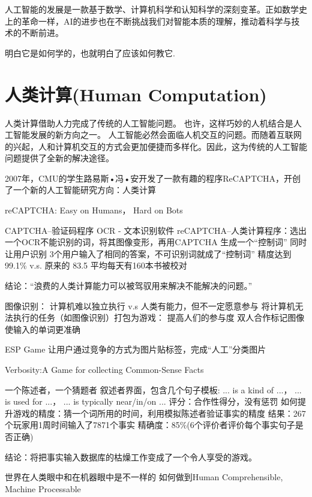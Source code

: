 人工智能的发展是一款基于数学、计算机科学和认知科学的深刻变革。正如数学史上的革命一样，AI的进步也在不断挑战我们对智能本质的理解，推动着科学与技术的不断前进。

明白它是如何学的，也就明白了应该如何教它.

\section{人类计算(Human Computation)}
人类计算借助人力完成了传统的人工智能问题。
 也许，这样巧妙的人机结合是人工智能发展的新方向之一。
人工智能必然会面临人机交互的问题。而随着互联网的兴起，人和计算机交互的方式会更加便捷而多样化。因此，这为传统的人工智能问题提供了全新的解决途径。

 2007年，CMU的学生路易斯•冯•安开发了一款有趣的程序ReCAPTCHA，开创了一个新的人工智能研究方向：人类计算

reCAPTCHA: Easy on Humans， Hard on Bots

 CAPTCHA–验证码程序
 OCR - 文本识别软件 
 reCAPTCHA–人类计算程序：选出一个OCR不能识别的词，将其图像变形，再用CAPTCHA 生成一个“控制词” 同时让用户识别 
 3个用户输入了相同的答案，不可识别词就成了“控制词” 
 精度达到99.1\% v.s. 原来的 83.5%
 平均每天有160本书被校对 

结论：“浪费的人类计算能力可以被驾驭用来解决不能解决的问题。”

图像识别：
       计算机难以独立执行  v.s   人类有能力，但不一定愿意参与
将计算机无法执行的任务（如图像识别）打包为游戏：
提高人们的参与度
双人合作标记图像使输入的单词更准确

ESP Game
让用户通过竞争的方式为图片贴标签，完成“人工”分类图片

Verbosity:A Game for collecting Common-Sense Facts

 一个陈述者，一个猜题者 
 叙述者界面，包含几个句子模板:
... is a kind of ...， 
... is used for ...， 
... is typically near/in/on ... 
 评分：合作性得分，没有惩罚 
 如何提升游戏的精度：猜一个词所用的时间，利用模拟陈述者验证事实的精度 
 结果：267个玩家用1周时间输入了7871个事实 
 精确度：85\%(6个评价者评价每个事实句子是否正确) 

结论：将把事实输入数据库的枯燥工作变成了一个令人享受的游戏。

% 
% 


世界在人类眼中和在机器眼中是不一样的 
如何做到Human Comprehensible, Machine Processable

